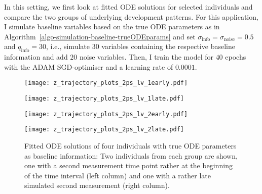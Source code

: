 In this setting, we first look at fitted ODE solutions for selected individuals and compare the two groups of underlying development patterns. For this application, I simulate baseline variables based on the true ODE parameters as in Algorithm~\ref{algo-simulation-baseline-trueODEparams} and set $\sigma_{\mathrm{info}} = \sigma_{\mathrm{noise}} = 0.5$ and $q_{\mathrm{info}}= 30$, i.e., simulate $30$ variables containing the respective baseline information and add $20$ noise variables. Then, I train the model for $40$ epochs with the ADAM SGD-optimiser and a learning rate of $0.0001$. 
\begin{figure}
	\centering
	\begin{minipage}{\linewidth}
		\begin{minipage}{.5\textwidth}
			\centering				
			\texttt{[image: z\_trajectory\_plots\_2ps\_lv\_1early.pdf]}
		\end{minipage}\begin{minipage}{.5\textwidth}
			\centering
			\texttt{[image: z\_trajectory\_plots\_2ps\_lv\_1late.pdf]}
		\end{minipage}
	\end{minipage}
	\begin{minipage}{\linewidth}
		\begin{minipage}{.5\textwidth}
			\centering
			\texttt{[image: z\_trajectory\_plots\_2ps\_lv\_2early.pdf]}
		\end{minipage}\begin{minipage}{.5\textwidth}
			\centering
			\texttt{[image: z\_trajectory\_plots\_2ps\_lv\_2late.pdf]}
		\end{minipage}
	\end{minipage}
	\caption{Fitted ODE solutions of four individuals with true ODE parameters as baseline information: Two individuals from each group are shown, one with a second measurement time point rather at the beginning of the time interval (left column) and one with a rather late simulated second measurement (right column).}
	\label{fig:apps_individual_solutions_tp_lv}
\end{figure}

